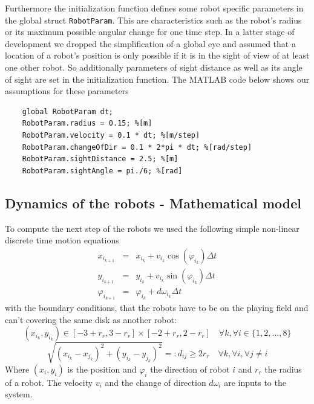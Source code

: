 Furthermore the initialization function defines some robot specific parameters in the global struct \texttt{RobotParam}. This are characteristics such as the robot's radius or its maximum possible angular change for one time step. In a latter stage of development we dropped the simplification of a global eye and assumed that a location of a robot's position is only possible if it is in the sight of view of at least one other robot. So additionally parameters of sight distance as well as its angle of sight are set in the initialization function. The MATLAB code below shows our assumptions for these parameters
\begin{lstlisting}
    global RobotParam dt;
    RobotParam.radius = 0.15; %[m]
    RobotParam.velocity = 0.1 * dt; %[m/step]
    RobotParam.changeOfDir = 0.1 * 2*pi * dt; %[rad/step]
    RobotParam.sightDistance = 2.5; %[m]
    RobotParam.sightAngle = pi./6; %[rad]
\end{lstlisting}
  
\subsection*{Dynamics of the robots - Mathematical model}
To compute the next step of the robots we used the following simple non-linear discrete time motion equations
\begin{eqnarray}
	x_{i_{k+1}} &=& x_{i_{k}} + v_{i_{k}} \cos(\varphi_{i_{k}}) \Delta t 	\label{robot_motion_first} \\
	y_{i_{k+1}} &=& y_{i_{k}} + v_{i_{k}} \sin(\varphi_{i_{k}}) \Delta t \\
	\varphi_{i_{k+1}} &=& \varphi_{i_{k}} + d\omega_{i_k} \Delta t
	\label{robot_motion_last}
\end{eqnarray}
with the boundary conditions, that the robots have to be on the playing field and can't covering the same disk as another robot:
	\[ (x_{i_{k}},y_{i_{k}}) \in [-3+r_r,3-r_r]\times[-2+r_r,2-r_r] \quad \forall k, \forall i\in \{1,2,\ldots,8 \}
	\]
	\[ \sqrt{(x_{i_{k}}-x_{j_{k}})^2 + (y_{i_{k}}-y_{j_{k}})^2} =: d_{ij} \geq 2r_r \quad \forall k, \forall i, \forall j\neq i
	\]
Where $(x_i,y_i)$ is the position and $\varphi_i$ the direction of robot $i$ and $r_r$ the radius of a robot. The velocity $v_i$ and the change of direction $d\omega_i$ are inputs to the system.


